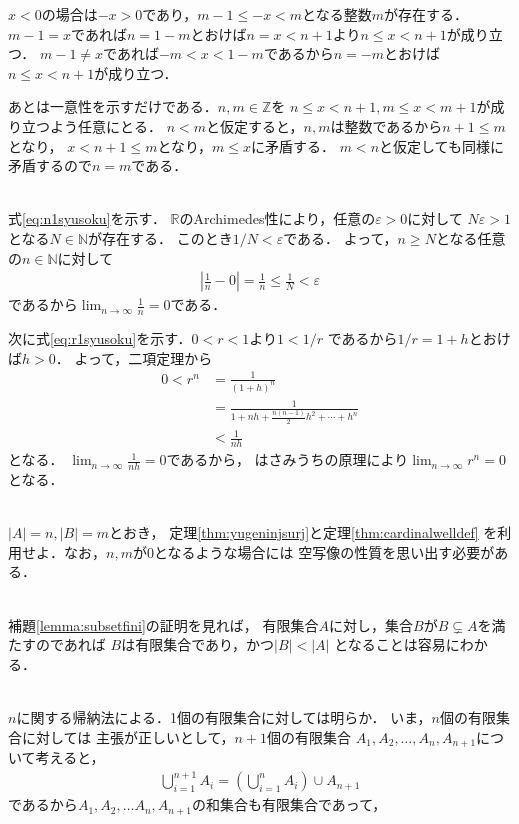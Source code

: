 \begin{description}
  $x<0$の場合は$-x>0$であり，$m-1 \leq -x <m$となる整数$m$が存在する．
  $m-1=x$であれば$n=1-m$とおけば$n=x<n+1$より$n \leq x <n+1$が成り立つ．
  $m-1 \neq x$であれば$-m < x < 1-m$であるから$n=-m$とおけば
  $n \leq x < n+1$が成り立つ．

  あとは一意性を示すだけである．$n ,  m \in \mathbb{Z}$を
  $n \leq x < n+1 ,  m \leq x < m+1$が成り立つよう任意にとる．
  $n<m$と仮定すると，$n,  m$は整数であるから$n+1 \leq m$となり，
  $x<n+1 \leq m$となり，$m \leq x$に矛盾する．
  $m<n$と仮定しても同様に矛盾するので$n=m$である．
\item[\refque{que:bekisyusoku}] \mbox{} \\
  式\eqref{eq:n1syusoku}を示す．
  $\mathbb{R}$のArchimedes性により，任意の$\varepsilon > 0$に対して
  $N \varepsilon >1$となる$N \in \mathbb{N}$が存在する．
  このとき$1/N < \varepsilon$である．
  よって，$n \geq N$となる任意の$n \in \mathbb{N}$に対して
  \begin{align*}
    \left \lvert \frac{1}{n} - 0 \right \rvert = 
    \frac{1}{n} \leq \frac{1}{N} < \varepsilon
  \end{align*}
  であるから$\displaystyle \lim_{n \to \infty} \frac{1}{n} =0$である．

  次に式\eqref{eq:r1syusoku}を示す．$0<r<1$より$ 1< 1/r$
  であるから$1/r = 1+h$とおけば$h>0$．
  よって，二項定理から
  \begin{align*}
    0<  r^n & = \frac{1}{(1+h)^n} \\
            & = \frac{1}{ 1+ nh + \displaystyle \frac{n(n-1)}{2}h^2 + \cdots + h^n} \\
            & < \frac{1}{nh}
  \end{align*}
  となる．
  $\displaystyle \lim_{n \to \infty} \frac{1}{nh}=0$であるから，
  はさみうちの原理により$\displaystyle \lim_{n \to \infty} r^n = 0$となる．




\item[\refque{que:finitecardAB}] \mbox{} \\
  $\lvert A \rvert = n ,  \lvert B \rvert = m$とおき，
  定理\ref{thm:yugeninjsurj}と定理\ref{thm:cardinalwelldef}
  を利用せよ．なお，$n,  m$が0となるような場合には
  空写像の性質を思い出す必要がある．


\item[\refque{que:dedekindiniffini}] \mbox{} \\
  補題\ref{lemma:subsetfini}の証明を見れば，
  有限集合$A$に対し，集合$B$が$B \subsetneq A$を満たすのであれば
  $B$は有限集合であり，かつ$\lvert B \rvert < \lvert A \rvert$
  となることは容易にわかる．
\item[\refque{que:houjogenri}] \mbox{} \\
  $n$に関する帰納法による．1個の有限集合に対しては明らか．
  いま，$n$個の有限集合に対しては
  主張が正しいとして，$n+1$個の有限集合
  $A_1, A_2, \ldots , A_n , A_{n+1}$について考えると，
  \begin{align*}
    \bigcup_{i=1}^{n+1} A_i = \left( \bigcup_{i=1}^{n} A_i \right) \cup A_{n+1}
  \end{align*}
  であるから$A_1, A_2, \ldots A_n , A_{n+1}$の和集合も有限集合であって，


\end{description}
